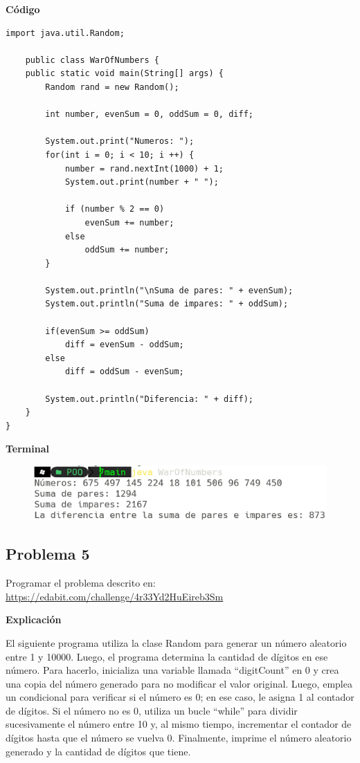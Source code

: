 \documentclass[11pt, twocolumn]{article}
\begin{document}
    \textbf{Código}
    \begin{lstlisting}
import java.util.Random;

    public class WarOfNumbers {
    public static void main(String[] args) {
        Random rand = new Random();

        int number, evenSum = 0, oddSum = 0, diff;

        System.out.print("Numeros: ");
        for(int i = 0; i < 10; i ++) {
            number = rand.nextInt(1000) + 1;
            System.out.print(number + " ");
            
            if (number % 2 == 0) 
                evenSum += number;
            else 
                oddSum += number;
        }

        System.out.println("\nSuma de pares: " + evenSum);
        System.out.println("Suma de impares: " + oddSum);

        if(evenSum >= oddSum)
            diff = evenSum - oddSum;
        else 
            diff = oddSum - evenSum;

        System.out.println("Diferencia: " + diff);
    }
}            
    \end{lstlisting}

    \textbf{Terminal}
    \begin{figure}[ht]
        \includegraphics[width=0.75\columnwidth, center]{P4.png}
    \end{figure}


    \subsection*{Problema 5}
    Programar el problema descrito en: \\
    \url{https://edabit.com/challenge/4r33Yd2HuEireb3Sm}

    \textbf{Explicación} 

    El siguiente programa utiliza la clase Random para generar un número aleatorio entre 1 y 10000. Luego, el programa determina la cantidad de dígitos en ese número. Para hacerlo, inicializa una variable llamada ``digitCount'' en 0 y crea una copia del número generado para no modificar el valor original. Luego, emplea un condicional para verificar si el número es 0; en ese caso, le asigna 1 al contador de dígitos. Si el número no es 0, utiliza un bucle ``while'' para dividir sucesivamente el número entre 10 y, al mismo tiempo, incrementar el contador de dígitos hasta que el número se vuelva 0. Finalmente, imprime el número aleatorio generado y la cantidad de dígitos que tiene.
\end{document}
